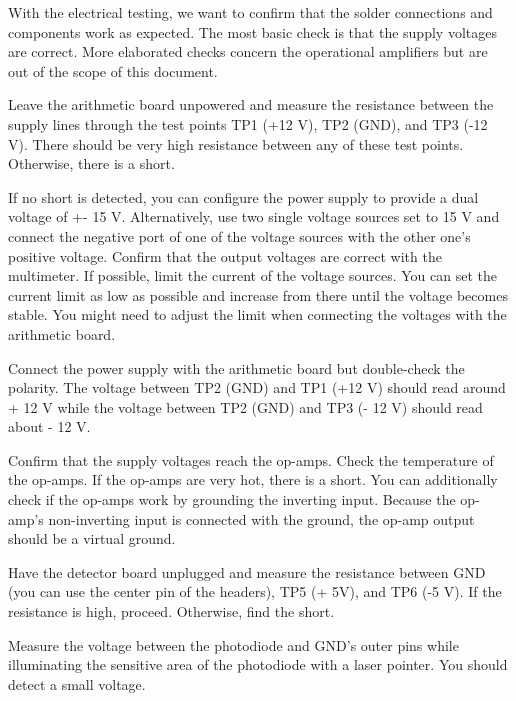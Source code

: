 With the electrical testing, we want to confirm that the solder connections and components work as expected.
The most basic check is that the supply voltages are correct.
More elaborated checks concern the operational amplifiers but are out of the scope of this document.


Leave the arithmetic board unpowered and measure the resistance between the supply lines through the test points TP1 (+12 V), TP2 (GND), and TP3 (-12 V).
There should be very high resistance between any of these test points.
Otherwise, there is a short.

If no short is detected, you can configure the power supply to provide a dual voltage of +- 15 V.
Alternatively, use two single voltage sources set to 15 V and connect the negative port of one of the voltage sources with the other one's positive voltage.
Confirm that the output voltages are correct with the multimeter. If possible, limit the current of the voltage sources.
You can set the current limit as low as possible and increase from there until the voltage becomes stable.
You might need to adjust the limit when connecting the voltages with the arithmetic board.

Connect the power supply with the arithmetic board but double-check the polarity.
The voltage between TP2 (GND) and TP1 (+12 V) should read around + 12 V while the voltage between TP2 (GND) and TP3 (- 12 V) should read about - 12 V.

Confirm that the supply voltages reach the op-amps.
Check the temperature of the op-amps.
If the op-amps are very hot, there is a short.
You can additionally check if the op-amps work by grounding the inverting input.
Because the op-amp's non-inverting input is connected with the ground, the op-amp output should be a virtual ground.


Have the detector board unplugged and measure the resistance between GND (you can use the center pin of the headers), TP5 (+ 5V), and TP6 (-5 V). If the resistance is high, proceed. Otherwise, find the short.

Measure the voltage between the photodiode and GND's outer pins while illuminating the sensitive area of the photodiode with a laser pointer.
You should detect a small voltage.


